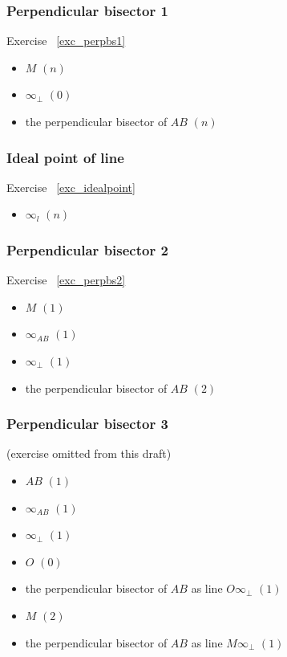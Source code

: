 \documentclass[a4paper]{article}
\begin{document}
\vspace{1cm}
\begin{minipage}{0.5\textwidth}
\subsubsection{Perpendicular bisector 1} Exercise ~\ref{exc_perpbs1}
\label{sol_perpbs1}
\begin{itemize}
    \item $M$ $(n)$
    \item $\infty_{\perp}$ $(0)$
    \item the perpendicular bisector of $AB$ $(n)$
\end{itemize}
\end{minipage}
\begin{minipage}{0.5\textwidth}
\subsubsection{Ideal point of line} Exercise ~\ref{exc_idealpoint}
\label{sol_idealpoint}
\begin{itemize}
    \item $\infty_l$ $(n)$
\end{itemize}
\end{minipage}

\vspace{1cm}
\begin{minipage}{0.5\textwidth}
\subsubsection{Perpendicular bisector 2} Exercise ~\ref{exc_perpbs2}
\label{sol_perpbs2}
\begin{itemize}
    \item $M$ $(1)$
    \item $\infty_{AB}$ $(1)$
    \item $\infty_{\perp}$ $(1)$
    \item the perpendicular bisector of $AB$ $(2)$
\end{itemize}
\end{minipage}
\begin{minipage}{0.5\textwidth}
\subsubsection{Perpendicular bisector 3} (exercise omitted from this draft)
\label{sol_perpbs3}
\begin{itemize}
    \item $AB$ $(1)$
    \item $\infty_{AB}$ $(1)$
    \item $\infty_{\perp}$ $(1)$
    \item $O$ $(0)$
    \item the perpendicular bisector of $AB$ as line $O\infty_{\perp}$ $(1)$
    \item $M$ $(2)$
    \item the perpendicular bisector of $AB$ as line $M\infty_{\perp}$ $(1)$
\end{itemize}
\end{minipage}
\end{document}
